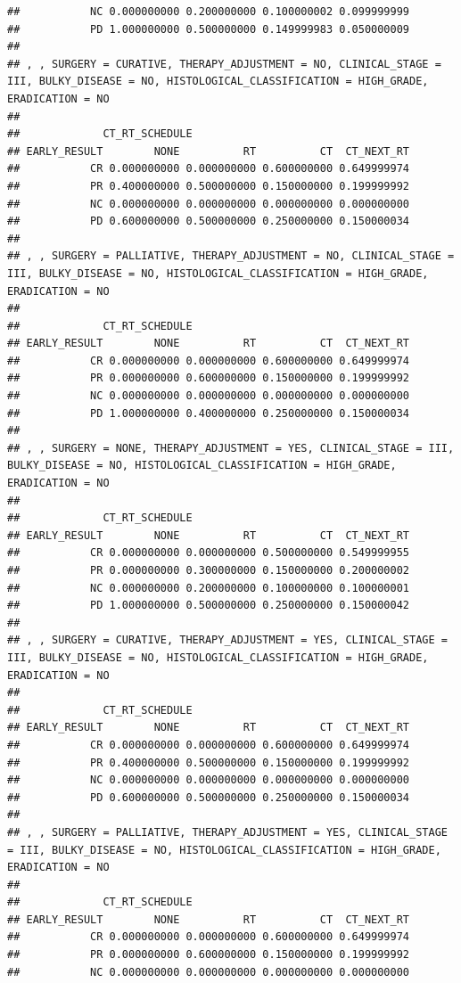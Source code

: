 \documentclass[]{article}
\begin{document}
\begin{verbatim}
##           NC 0.000000000 0.200000000 0.100000002 0.099999999
##           PD 1.000000000 0.500000000 0.149999983 0.050000009
## 
## , , SURGERY = CURATIVE, THERAPY_ADJUSTMENT = NO, CLINICAL_STAGE = III, BULKY_DISEASE = NO, HISTOLOGICAL_CLASSIFICATION = HIGH_GRADE, ERADICATION = NO
## 
##             CT_RT_SCHEDULE
## EARLY_RESULT        NONE          RT          CT  CT_NEXT_RT
##           CR 0.000000000 0.000000000 0.600000000 0.649999974
##           PR 0.400000000 0.500000000 0.150000000 0.199999992
##           NC 0.000000000 0.000000000 0.000000000 0.000000000
##           PD 0.600000000 0.500000000 0.250000000 0.150000034
## 
## , , SURGERY = PALLIATIVE, THERAPY_ADJUSTMENT = NO, CLINICAL_STAGE = III, BULKY_DISEASE = NO, HISTOLOGICAL_CLASSIFICATION = HIGH_GRADE, ERADICATION = NO
## 
##             CT_RT_SCHEDULE
## EARLY_RESULT        NONE          RT          CT  CT_NEXT_RT
##           CR 0.000000000 0.000000000 0.600000000 0.649999974
##           PR 0.000000000 0.600000000 0.150000000 0.199999992
##           NC 0.000000000 0.000000000 0.000000000 0.000000000
##           PD 1.000000000 0.400000000 0.250000000 0.150000034
## 
## , , SURGERY = NONE, THERAPY_ADJUSTMENT = YES, CLINICAL_STAGE = III, BULKY_DISEASE = NO, HISTOLOGICAL_CLASSIFICATION = HIGH_GRADE, ERADICATION = NO
## 
##             CT_RT_SCHEDULE
## EARLY_RESULT        NONE          RT          CT  CT_NEXT_RT
##           CR 0.000000000 0.000000000 0.500000000 0.549999955
##           PR 0.000000000 0.300000000 0.150000000 0.200000002
##           NC 0.000000000 0.200000000 0.100000000 0.100000001
##           PD 1.000000000 0.500000000 0.250000000 0.150000042
## 
## , , SURGERY = CURATIVE, THERAPY_ADJUSTMENT = YES, CLINICAL_STAGE = III, BULKY_DISEASE = NO, HISTOLOGICAL_CLASSIFICATION = HIGH_GRADE, ERADICATION = NO
## 
##             CT_RT_SCHEDULE
## EARLY_RESULT        NONE          RT          CT  CT_NEXT_RT
##           CR 0.000000000 0.000000000 0.600000000 0.649999974
##           PR 0.400000000 0.500000000 0.150000000 0.199999992
##           NC 0.000000000 0.000000000 0.000000000 0.000000000
##           PD 0.600000000 0.500000000 0.250000000 0.150000034
## 
## , , SURGERY = PALLIATIVE, THERAPY_ADJUSTMENT = YES, CLINICAL_STAGE = III, BULKY_DISEASE = NO, HISTOLOGICAL_CLASSIFICATION = HIGH_GRADE, ERADICATION = NO
## 
##             CT_RT_SCHEDULE
## EARLY_RESULT        NONE          RT          CT  CT_NEXT_RT
##           CR 0.000000000 0.000000000 0.600000000 0.649999974
##           PR 0.000000000 0.600000000 0.150000000 0.199999992
##           NC 0.000000000 0.000000000 0.000000000 0.000000000

\end{verbatim}
\end{document}
